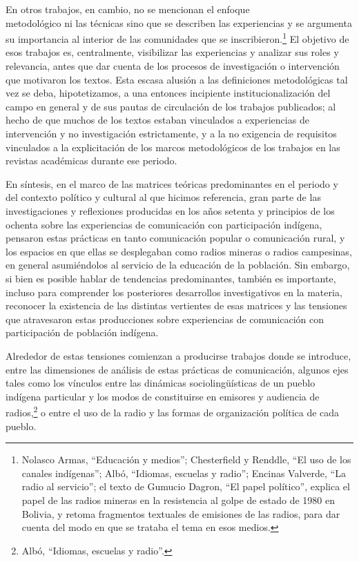 \documentclass{tufte-handout}
\begin{document}
En otros trabajos, en cambio, no se mencionan el enfoque \\\noindent metodológico ni
las técnicas sino que se describen las experiencias y se argumenta su
importancia al interior de las comunidades que se
inscribieron.\footnote{Nolasco Armas, ``Educación y medios'';
  Chesterfield y Renddle, ``El uso de los canales indígenas''; Albó,
  ``Idiomas, escuelas y radio''; Encinas Valverde, ``La radio al
  servicio''; el texto de Gumucio Dagron, ``El papel político'', explica
  el papel de las radios mineras en la resistencia al golpe de estado de
  1980 en Bolivia, y retoma fragmentos textuales de emisiones de las
  radios, para dar cuenta del modo en que se trataba el tema en esos
  medios.} El objetivo de esos trabajos es, centralmente, visibilizar
las experiencias y analizar sus roles y relevancia, antes que dar cuenta
de los procesos de investigación o intervención que motivaron los
textos. Esta escasa alusión a las definiciones metodológicas tal vez se
deba, hipotetizamos, a una entonces incipiente institucionalización del
campo en general y de sus pautas de circulación de los trabajos
publicados; al hecho de que muchos de los textos estaban vinculados a
experiencias de intervención y no investigación estrictamente, y a la no
exigencia de requisitos vinculados a la explicitación de los marcos
metodológicos de los trabajos en las revistas académicas durante ese
periodo.

\newpage

En síntesis, en el marco de las matrices teóricas predominantes en el
periodo y del contexto político y cultural al que hicimos referencia,
gran parte de las investigaciones y reflexiones producidas en los años
setenta y principios de los ochenta sobre las experiencias de
comunicación con participación indígena, pensaron estas prácticas en
tanto comunicación popular o comunicación rural, y los espacios en que
ellas se desplegaban como radios mineras o radios campesinas, en general
asumiéndolos al servicio de la educación de la población. Sin embargo,
si bien es posible hablar de tendencias predominantes, también es
importante, incluso para comprender los posteriores desarrollos
investigativos en la materia, reconocer la existencia de las distintas
vertientes de esas matrices y las tensiones que atravesaron estas
producciones sobre experiencias de comunicación con participación de
población indígena.

Alrededor de estas tensiones comienzan a producirse trabajos donde se
introduce, entre las dimensiones de análisis de estas prácticas de
comunicación, algunos ejes tales como los vínculos entre las dinámicas
sociolingüísticas de un pueblo indígena particular y los modos de
constituirse en emisores y audiencia de radios,\footnote{Albó,
  ``Idiomas, escuelas y radio''.} o entre el uso de la radio y las
formas de organización política de cada pueblo.
\end{document}
